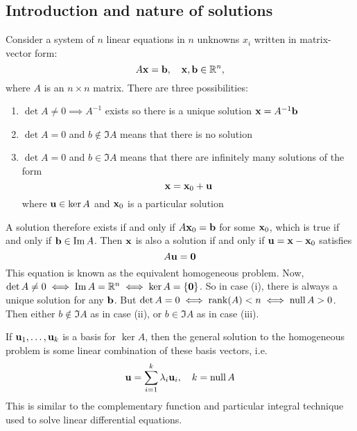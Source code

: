 \subsection{Introduction and nature of solutions}
Consider a system of \(n\) linear equations in \(n\) unknowns \(x_i\) written in matrix-vector form:
\[
	A\vb x = \vb b,\quad \vb x, \vb b \in \mathbb R^n,
\]
where \(A\) is an \(n \times n\) matrix.
There are three possibilities:
\begin{enumerate}
	\item \(\det A \neq 0 \implies A^{-1}\) exists so there is a unique solution \(\vb x = A^{-1} \vb b\)
	\item \(\det A = 0\) and \(b \notin \Im A\) means that there is no solution
	\item \(\det A = 0\) and \(b \in \Im A\) means that there are infinitely many solutions of the form
	      \[
		      \vb x = \vb x_0 + \vb u
	      \]
	      where \(\vb u \in \ker A\) and \(\vb x_0\) is a particular solution
\end{enumerate}
A solution therefore exists if and only if \(A\vb x_0 = \vb b\) for some \(\vb x_0\), which is true if and only if \(\vb b \in \Im A\).
Then \(\vb x\) is also a solution if and only if \(\vb u = \vb x - \vb x_0\) satisfies
\[
	A\vb u = \vb 0
\]
This equation is known as the equivalent homogeneous problem.
Now, \(\det A \neq 0 \iff \Im A = \mathbb R^n \iff \ker A = \{ \vb 0 \}\).
So in case (i), there is always a unique solution for any \(\vb b\).
But \(\det A = 0 \iff \rank(A) < n \iff \operatorname{null} A > 0\).
Then either \(b \notin \Im A\) as in case (ii), or \(b \in \Im A\) as in case (iii).

If \(\vb u_1, \dots, \vb u_k\) is a basis for \(\ker A\), then the general solution to the homogeneous problem is some linear combination of these basis vectors, i.e.
\[
	\vb u = \sum_{i=1}^k \lambda_i \vb u_i,\quad k = \operatorname{null} A
\]
This is similar to the complementary function and particular integral technique used to solve linear differential equations.

